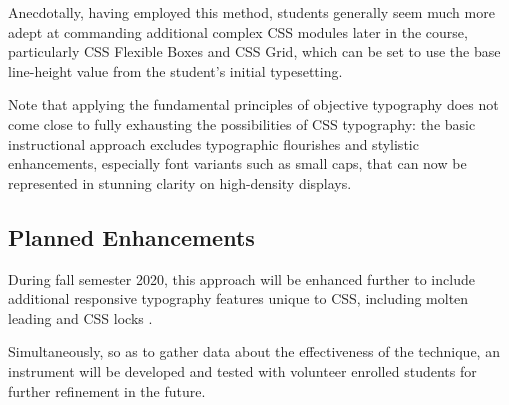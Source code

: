 \documentclass[sigplan,screen]{acmart}
\begin{document}
Anecdotally, having employed this method, students generally seem much more adept at commanding additional complex CSS modules later in the course, particularly CSS Flexible Boxes and CSS Grid, which can be set to use the base line-height value from the student's initial typesetting.

Note that applying the fundamental principles of objective typography does not come close to fully exhausting the possibilities of CSS typography: the basic instructional approach excludes typographic flourishes and stylistic enhancements, especially font variants such as small caps, that can now be represented in stunning clarity on high-density displays.

\subsection{Planned Enhancements}

During fall semester 2020, this approach will be enhanced further to include additional responsive typography features unique to CSS, including molten leading and CSS locks \cite{tb:ml,tb:cl}.

Simultaneously, so as to gather data about the effectiveness of the technique, an instrument will be developed and tested with volunteer enrolled students for further refinement in the future.



\end{document}
